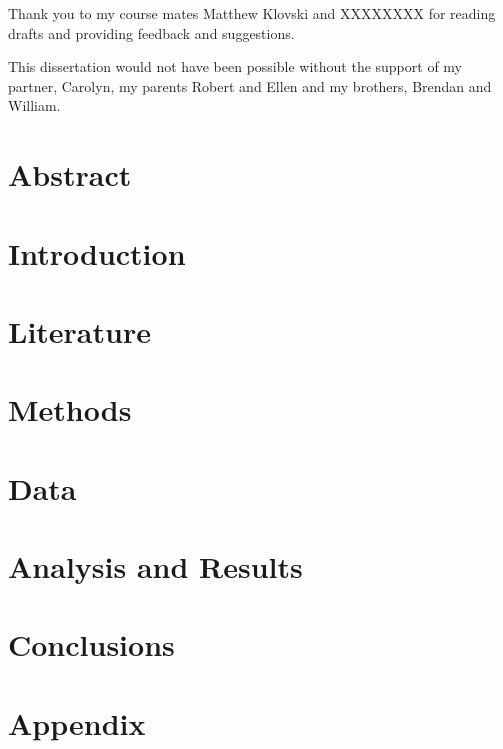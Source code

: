 \documentclass[hidelinks,11pt]{article} %
\begin{document}
Thank you to my course mates Matthew Klovski and XXXXXXXX for reading drafts and providing feedback and suggestions. 

This dissertation would not have been possible without the support of my partner, Carolyn, my parents Robert and Ellen and my brothers, Brendan and William. 
%
%
\pagebreak

\section{Abstract} \label{abstract}


\pagebreak

\tableofcontents
\pagebreak

\listoffigures
\listoftables
\pagebreak

\section{Introduction} \label{introduction}

	

\section{Literature} \label{literature}

	

\section{Methods} \label{methods}

	


\section{Data} \label{data} 

	

\section{Analysis and Results}\label{analysis}

	


\section{Conclusions} \label{conclusions}

	


\pagebreak

\section{Appendix}



\pagebreak

\printbibliography
\end{document}
